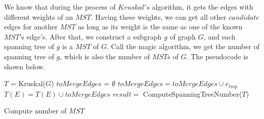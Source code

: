 \documentclass[UTF8]{ctexart}
\begin{document}
    We know that during the process of $Kruskal's$ algorithm, it gets the edges with different weights
    of an $MST$. Having these weights, we can get all other $candidate$ edges for another $MST$ as long 
    as its weight is the same as one of the known $MST$'s edge's. After that, we construct a subgraph $g$
    of graph $G$, and each spanning tree of $g$ is a $MST$ of $G$. Call the magic algorithm, we get the number
    of spanning tree of $g$, which is also the number of $MST$s of $G$. The pseudocode is shown below.

    \begin{algorithm}[H]
        $T$ = Kruskal($G$)\;
        $toMergeEdges$ = $ \emptyset$ \; 
         {
             {
                 {
                    $toMergeEdges = toMergeEdges \cup e_{tmp}$\;
                }
            }
        }
        $T(E) = T(E) \cup toMergeEdges $\;
        $result = $ ComputeSpanningTreeNumber($T$)\;
        \caption{Compute number of $MST$}
       \end{algorithm}
\end{document}
